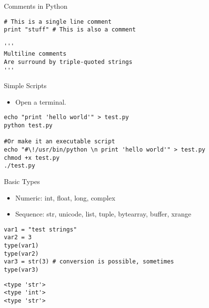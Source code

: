 \documentclass[presentation]{beamer}
\begin{document}
\begin{frame}[fragile,label=sec-4-1-3]{Comments in Python}
 \lstset{numbers=left,language=Python,label= ,caption= }
\begin{lstlisting}
# This is a single line comment
print "stuff" # This is also a comment

'''
Multiline comments 
Are surround by triple-quoted strings
'''
\end{lstlisting}

\end{frame}


\begin{frame}[fragile,label=sec-4-1-4]{Simple Scripts}
 \begin{itemize}
\item Open a terminal.
\end{itemize}
\lstset{numbers=left,language=sh,label= ,caption= }
\begin{lstlisting}
echo "print 'hello world'" > test.py
python test.py 

#Or make it an executable script
echo "#\!/usr/bin/python \n print 'hello world'" > test.py
chmod +x test.py
./test.py
\end{lstlisting}

\end{frame}


\begin{frame}[fragile,label=sec-4-1-5]{Basic Types}
 \begin{itemize}
\item Numeric: int, float, long, complex
\item Sequence: str, unicode, list, tuple, bytearray, buffer, xrange
\end{itemize}
\lstset{numbers=left,language=Python,label= ,caption= }
\begin{lstlisting}
var1 = "test strings"
var2 = 3      
type(var1) 
type(var2)
var3 = str(3) # conversion is possible, sometimes
type(var3)
\end{lstlisting}

\lstset{numbers=left,language=Python,label= ,caption= }
\begin{lstlisting}
<type 'str'>
<type 'int'>
<type 'str'>
\end{lstlisting}
\end{frame}
\end{document}
